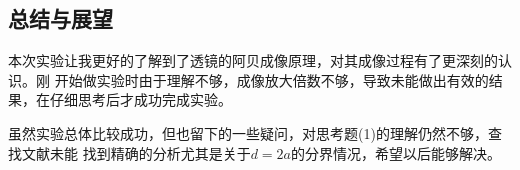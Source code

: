 \documentclass{ctexart}
\begin{document}
	\nocite{*}

	\subsection*{总结与展望}
	本次实验让我更好的了解到了透镜的阿贝成像原理，对其成像过程有了更深刻的认识。刚
	开始做实验时由于理解不够，成像放大倍数不够，导致未能做出有效的结果，在仔细思考后才成功完成实验。
	
	虽然实验总体比较成功，但也留下的一些疑问，对思考题(1)的理解仍然不够，查找文献未能
	找到精确的分析尤其是关于$d = 2a$的分界情况，希望以后能够解决。


	
	
	
	
	\label{unknown}
\end{document}
